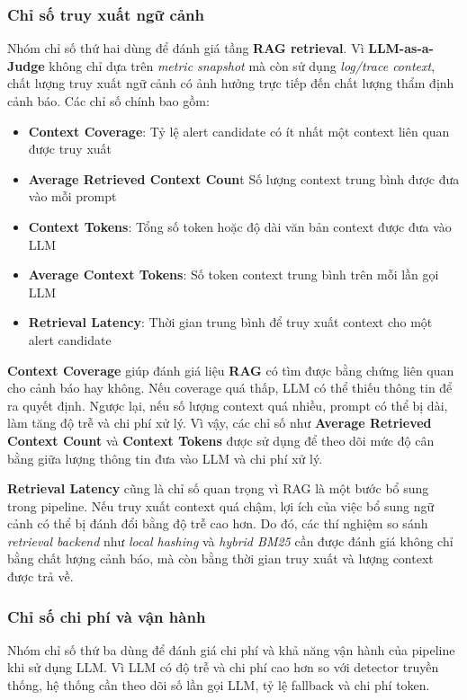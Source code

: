 \subsubsection{Chỉ số truy xuất ngữ cảnh}
Nhóm chỉ số thứ hai dùng để đánh giá tầng \textbf{RAG retrieval}. Vì \textbf{LLM-as-a-Judge} không chỉ dựa trên \textit{metric snapshot} mà còn sử dụng \textit{log/trace context}, chất lượng truy xuất ngữ cảnh có ảnh hưởng trực tiếp đến chất lượng thẩm định cảnh báo.
Các chỉ số chính bao gồm:
\begin{itemize}[label=--]
    \item \textbf{Context Coverage}: Tỷ lệ alert candidate có ít nhất một context liên quan được truy xuất
\item \textbf{Average Retrieved Context Coun}t	Số lượng context trung bình được đưa vào mỗi prompt
\item \textbf{Context Tokens}: Tổng số token hoặc độ dài văn bản context được đưa vào LLM
\item \textbf{Average Context Tokens}: Số token context trung bình trên mỗi lần gọi LLM
\item \textbf{Retrieval Latency}: Thời gian trung bình để truy xuất context cho một alert candidate
\end{itemize}
\textbf{Context Coverage} giúp đánh giá liệu \textbf{RAG} có tìm được bằng chứng liên quan cho cảnh báo hay không. Nếu coverage quá thấp, LLM có thể thiếu thông tin để ra quyết định. Ngược lại, nếu số lượng context quá nhiều, prompt có thể bị dài, làm tăng độ trễ và chi phí xử lý. Vì vậy, các chỉ số như \textbf{Average Retrieved Context Count} và \textbf{Context Tokens} được sử dụng để theo dõi mức độ cân bằng giữa lượng thông tin đưa vào LLM và chi phí xử lý.

\textbf{Retrieval Latency} cũng là chỉ số quan trọng vì RAG là một bước bổ sung trong pipeline. Nếu truy xuất context quá chậm, lợi ích của việc bổ sung ngữ cảnh có thể bị đánh đổi bằng độ trễ cao hơn. Do đó, các thí nghiệm so sánh \textit{retrieval backend} như \textit{local hashing} và \textit{hybrid BM25} cần được đánh giá không chỉ bằng chất lượng cảnh báo, mà còn bằng thời gian truy xuất và lượng context được trả về.

\subsubsection{Chỉ số chi phí và vận hành}
Nhóm chỉ số thứ ba dùng để đánh giá chi phí và khả năng vận hành của pipeline khi sử dụng LLM. Vì LLM có độ trễ và chi phí cao hơn so với detector truyền thống, hệ thống cần theo dõi số lần gọi LLM, tỷ lệ fallback và chi phí token.

